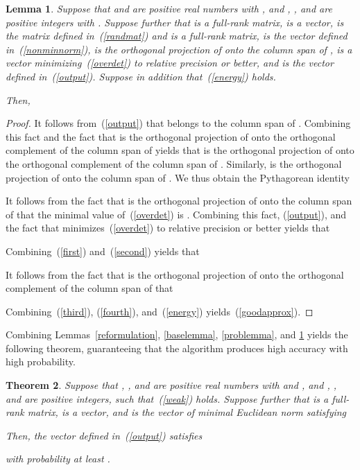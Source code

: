 \documentclass[letterpaper,12pt]{article}
\newtheorem{theorem}{Theorem}[section]
\newtheorem{lemma}[theorem]{Lemma}
\begin{document}
\begin{lemma}
\label{mainlemma}
Suppose that  and  are positive real numbers
with ,
and , , and  are positive integers with .
Suppose further that  is a full-rank matrix,
 is a vector,
 is the matrix defined in~(\ref{randmat})
and is a full-rank matrix,
 is the vector defined in~(\ref{nonminnorm}),
 is the orthogonal projection of 
onto the column span of ,
 is a vector minimizing~(\ref{overdet})
to relative precision  or better,
and  is the vector defined in~(\ref{output}).
Suppose in addition that~(\ref{energy}) holds.

Then,

\end{lemma}

\begin{proof}
It follows from~(\ref{output}) that 
belongs to the column span of .
Combining this fact and the fact that 
is the orthogonal projection of 
onto the orthogonal complement of the column span of 
yields that  is the orthogonal projection
of 
onto the orthogonal complement of the column span of .
Similarly,  is the orthogonal projection
of 
onto the column span of .
We thus obtain the Pythagorean identity


It follows from the fact that  is the orthogonal projection
of  onto the column span of  that
the minimal value of~(\ref{overdet})
is .
Combining this fact, (\ref{output}), and the fact that 
minimizes~(\ref{overdet}) to relative precision 
or better yields that


Combining~(\ref{first}) and~(\ref{second}) yields that


It follows from the fact that 
is the orthogonal projection of 
onto the orthogonal complement of the column span of  that

Combining~(\ref{third}), (\ref{fourth}), and~(\ref{energy})
yields~(\ref{goodapprox}).
\end{proof}


Combining Lemmas~\ref{reformulation}, \ref{baselemma}, \ref{problemma},
and \ref{mainlemma} yields the following theorem,
guaranteeing that the algorithm produces high accuracy with high probability.

\begin{theorem}
\label{main_theorem}
Suppose that , , and  are positive real numbers
with  and ,
and , , and  are positive integers, such that~(\ref{weak}) holds.
Suppose further that  is a full-rank matrix,
 is a vector,
and  is the vector of minimal Euclidean norm satisfying


Then, the vector  defined in~(\ref{output}) satisfies

with probability at least .
\end{theorem}
\end{document}
